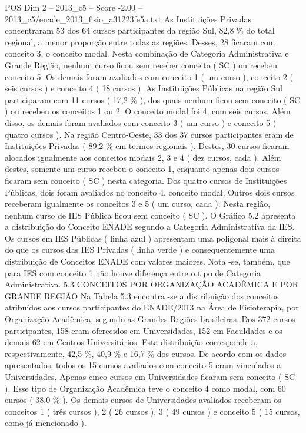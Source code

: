 \begin{textsample}{POS Dim 2 – 2013\_c5 – Score -2.00 – 2013\_c5/enade\_2013\_fisio\_a31223fe5a.txt}
As Instituições Privadas concentraram 53 dos 64 cursos participantes da região Sul, 82,8 \% do total regional, a menor proporção entre todas as regiões.
Desses, 28 ficaram com conceito 3, o conceito modal.
Nesta combinação de Categoria Administrativa e Grande Região, nenhum curso ficou sem receber conceito ( SC ) ou recebeu conceito 5.
Os demais foram avaliados com conceito 1 ( um curso ), conceito 2 ( seis cursos ) e conceito 4 ( 18 cursos ).
As Instituições Públicas na região Sul participaram com 11 cursos ( 17,2 \% ), dos quais nenhum ficou sem conceito ( SC ) ou recebeu os conceitos 1 ou 2.
O conceito modal foi 4, com seis cursos.
Além disso, os demais foram avaliados com conceito 3 ( um curso ) e conceito 5 ( quatro cursos ).
Na região Centro-Oeste, 33 dos 37 cursos participantes eram de Instituições Privadas ( 89,2 \% em termos regionais ).
Destes, 30 cursos ficaram alocados igualmente aos conceitos modais 2, 3 e 4 ( dez cursos, cada ).
Além destes, somente um curso recebeu o conceito 1, enquanto apenas dois cursos ficaram sem conceito ( SC ) nesta categoria.
Dos quatro cursos de Instituições Públicas, dois foram avaliados no conceito 4, conceito modal.
Outros dois cursos receberam igualmente os conceitos 3 e 5 ( um curso, cada ).
Nesta região, nenhum curso de IES Pública ficou sem conceito ( SC ).
O Gráfico 5.2 apresenta a distribuição do Conceito ENADE segundo a Categoria Administrativa da IES.
Os cursos em IES Públicas ( linha azul ) apresentam uma poligonal mais à direita do que os cursos das IES Privadas ( linha verde ) e consequentemente uma distribuição de Conceitos ENADE com valores maiores.
Nota -se, também, que para IES com conceito 1 não houve diferença entre o tipo de Categoria Administrativa. 5.3 CONCEITOS POR ORGANIZAÇÃO ACADÊMICA E POR GRANDE REGIÃO Na Tabela 5.3 encontra -se a distribuição dos conceitos atribuídos aos cursos participantes do ENADE/2013 na Área de Fisioterapia, por Organização Acadêmica, segundo as Grandes Regiões brasileiras.
Dos 372 cursos participantes, 158 eram oferecidos em Universidades, 152 em Faculdades e os demais 62 em Centros Universitários.
Esta distribuição corresponde a, respectivamente, 42,5 \%, 40,9 \% e 16,7 \% dos cursos.
De acordo com os dados apresentados, todos os 15 cursos avaliados com conceito 5 eram vinculados a Universidades.
Apenas cinco cursos em Universidades ficaram sem conceito ( SC ).
Esse tipo de Organização Acadêmica teve o conceito 4 como modal, com 60 cursos ( 38,0 \% ).
Os demais cursos de Universidades avaliados receberam os conceitos 1 ( três cursos ), 2 ( 26 cursos ), 3 ( 49 cursos ) e conceito 5 ( 15 cursos, como já mencionado ).

\end{textsample}
